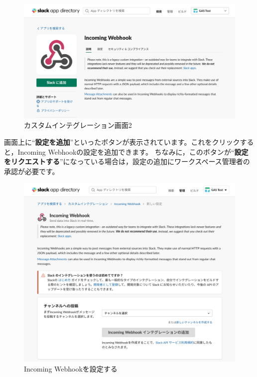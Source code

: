 \documentclass[uplatex,a4j]{jsarticle}
\begin{document}
\begin{figure}[h]
 \centering
 \includegraphics[keepaspectratio, scale=0.5]{images/custom_integration2.png}
 \caption{カスタムインテグレーション画面2}
 \label{fig:custom_integration2}
\end{figure}

画面上に``\textbf{設定を追加}''といったボタンが表示されています。これをクリックすると，Incoming Webhookの設定を追加できます。
ちなみに，このボタンが``\textbf{設定をリクエストする}''になっている場合は，設定の追加にワークスペース管理者の承認が必要です。

\begin{figure}[h]
  \centering
  \includegraphics[keepaspectratio, scale=0.4]{images/configure_incoming_webhook.png}
  \caption{Incoming Webhookを設定する}
 \end{figure}
\end{document}
